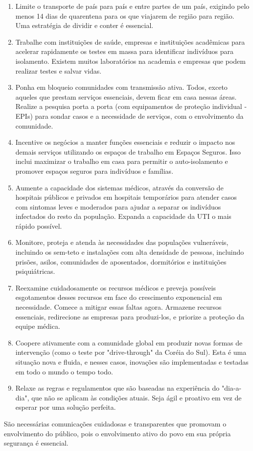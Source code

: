 \documentclass[onecolumn,journal]{IEEEtran}
\begin{document}
\begin{multicols}{2}
\begin{enumerate}
\item Limite o transporte de país para país e entre partes de um país, exigindo pelo menos 14 dias de quarentena para os que viajarem de região para região. Uma estratégia de dividir e conter é essencial.
\item Trabalhe com instituições de saúde, empresas e instituições acadêmicas para acelerar rapidamente os testes em massa para identificar indivíduos para isolamento. Existem muitos laboratórios na academia e empresas que podem realizar testes e salvar vidas.
\item Ponha em bloqueio comunidades com transmissão ativa. Todos, exceto aqueles que prestam serviços essenciais, devem ficar em casa nessas áreas. Realize a pesquisa porta a porta (com equipamentos de proteção individual - EPIs) para sondar casos e a necessidade de serviços, com o envolvimento da comunidade.
\item Incentive os negócios a manter funções essenciais e reduzir o impacto nos demais serviços utilizando os espaços de trabalho em Espaços Seguros. Isso inclui maximizar o trabalho em casa para permitir o auto-isolamento e promover espaços seguros para indivíduos e famílias.
\item Aumente a capacidade dos sistemas médicos, através da conversão de hospitais públicos e privados em hospitais temporários para atender casos com sintomas leves e moderados para ajudar a separar os indivíduos infectados do resto da população. Expanda a capacidade da UTI o mais rápido possível.
\item Monitore, proteja e atenda às necessidades das populações vulneráveis, incluindo os sem-teto e instalações com alta densidade de pessoas, incluindo prisões, asilos, comunidades de aposentados, dormitórios e instituições psiquiátricas.
\item Reexamine cuidadosamente os recursos médicos e preveja possíveis esgotamentos desses recursos em face do crescimento exponencial em necessidade. Comece a mitigar essas faltas agora. Armazene recursos essenciais, redirecione as empresas para produzi-los, e priorize a proteção da equipe médica.
\item Coopere ativamente com a comunidade global em produzir novas formas de intervenção (como o teste por "drive-through" da Coréia do Sul). Esta é uma situação nova e fluida, e nesses casos, inovações são implementadas e testadas em todo o mundo o tempo todo.
\item Relaxe as regras e regulamentos que são baseadas na experiência do "dia-a-dia", que não se aplicam às condições atuais. Seja ágil e proativo em vez de esperar por uma solução perfeita.
\end{enumerate}

São necessárias comunicações cuidadosas e transparentes que promovam o envolvimento do público, pois o envolvimento ativo do povo em sua própria segurança é essencial.

\end{multicols}

\vspace{2ex}

% 

\end{document}
